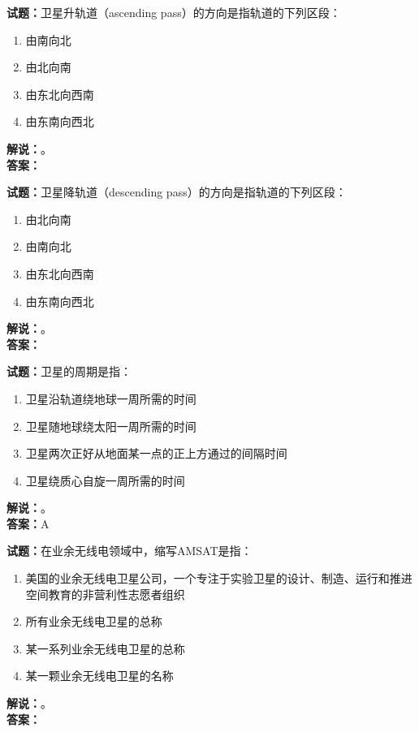 \documentclass{ctexbook}
\begin{document}
\bigskip




\noindent\textbf{试题：}卫星升轨道（ascending pass）的方向是指轨道的下列区段：
\begin{enumerate}[leftmargin=3em]
\item 由南向北
\item 由北向南
\item 由东北向西南
\item 由东南向西北
\end{enumerate}
\noindent\textbf{解说：}\textbf{}。\\\noindent\textbf{答案：}

\bigskip




\noindent\textbf{试题：}卫星降轨道（descending pass）的方向是指轨道的下列区段：
\begin{enumerate}[leftmargin=3em]
\item 由北向南
\item 由南向北
\item 由东北向西南
\item 由东南向西北
\end{enumerate}
\noindent\textbf{解说：}\textbf{}。\\\noindent\textbf{答案：}

\bigskip




\noindent\textbf{试题：}卫星的周期是指：
\begin{enumerate}[leftmargin=3em]
\item 卫星沿轨道绕地球一周所需的时间
\item 卫星随地球绕太阳一周所需的时间
\item 卫星两次正好从地面某一点的正上方通过的间隔时间
\item 卫星绕质心自旋一周所需的时间
\end{enumerate}
\noindent\textbf{解说：}。\\\noindent\textbf{答案：}A


\bigskip




\noindent\textbf{试题：}在业余无线电领域中，缩写AMSAT是指：
\begin{enumerate}[leftmargin=3em]
\item 美国的业余无线电卫星公司，一个专注于实验卫星的设计、制造、运行和推进空间教育的非营利性志愿者组织
\item 所有业余无线电卫星的总称
\item 某一系列业余无线电卫星的总称
\item 某一颗业余无线电卫星的名称
\end{enumerate}
\noindent\textbf{解说：}\textbf{}。\\\noindent\textbf{答案：}
\end{document}
